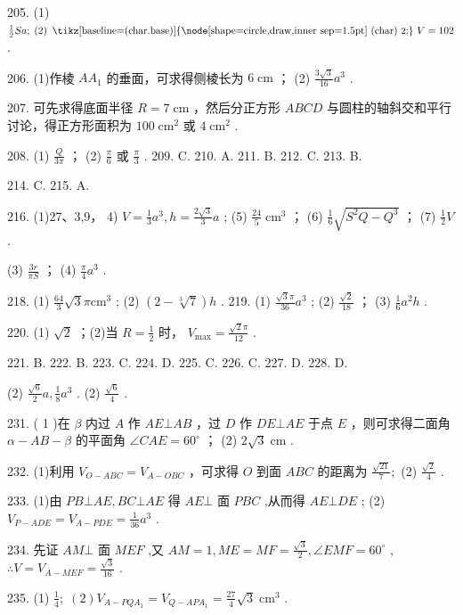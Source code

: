 \documentclass[10pt]{article}
\newcommand*\circled[1]{\tikz[baseline=(char.base)]{\node[shape=circle,draw,inner sep=1.5pt] (char) {\small #1};}}
\begin{document}
205. (1) \(\frac{1}{2}{Sa};\;\left( 2\right) \text{  \circled{2}  }V = {102}\) .

206. (1)作棱 \(A{A}_{1}\) 的垂面，可求得侧棱长为 \(6\mathrm{\;{cm}}\) ； (2) \(\frac{3\sqrt{3}}{16}{a}^{3}\) .

207. 可先求得底面半径 \(R = 7\mathrm{\;{cm}}\) ，然后分正方形 \({ABCD}\) 与圆柱的轴斜交和平行讨论，得正方形面积为 \({100}{\mathrm{\;{cm}}}^{2}\) 或 \(4{\mathrm{\;{cm}}}^{2}\) .

208. (1) \(\frac{Q}{3\pi }\) ； (2) \(\frac{\pi }{6}\) 或 \(\frac{\pi }{3}\) . 209. C. 210. A. 211. B. 212. C. 213. B.

214. C. 215. A.

216. (1)27、3,9， 4) \(V = \frac{1}{3}{a}^{3},h = \frac{2\sqrt{3}}{3}a\) ; (5) \(\frac{24}{5}{\mathrm{\;{cm}}}^{3}\) ； (6) \(\frac{1}{6}\sqrt{{S}^{2}Q - {Q}^{3}}\) ； (7) \(\frac{1}{2}V\) .

(3) \(\frac{3r}{\pi S}\) ； (4) \(\frac{\pi }{4}{a}^{3}\) .

218. (1) \(\frac{64}{3}\sqrt{3}\pi {\mathrm{{cm}}}^{3}\) ; (2) \(\left( {2 - \sqrt[3]{7}}\right) h\) . 219. (1) \(\frac{\sqrt{3}\pi }{36}{a}^{3}\) ; (2) \(\frac{\sqrt{2}}{18}\) ； (3) \(\frac{1}{6}{a}^{2}h\) .

220. (1) \(\sqrt{2}\) ；(2)当 \(R = \frac{1}{2}\) 时， \({V}_{\max } = \frac{\sqrt{2}\pi }{12}\) .

221. B. 222. B. 223. C. 224. D. 225. C. 226. C. 227. D. 228. D.

(2) \(\frac{\sqrt{6}}{2}a,\frac{1}{8}{a}^{3}\) . (2) \(\frac{\sqrt{6}}{4}\) .

231. ( 1 )在 \(\beta\) 内过 \(A\) 作 \({AE} \bot  {AB}\) ，过 \(D\) 作 \({DE} \bot  {AE}\) 于点 \(E\) ，则可求得二面角 \(\alpha  - {AB} - \beta\) 的平面角 \(\angle {CAE} = {60}^{ \circ  }\) ； (2) \(2\sqrt{3}\mathrm{\;{cm}}\) .

232. (1)利用 \({V}_{O - {ABC}} = {V}_{A - {OBC}}\) ，可求得 \(O\) 到面 \({ABC}\) 的距离为 \(\frac{\sqrt{21}}{7};\) (2) \(\frac{\sqrt{2}}{4}\) .

233. (1)由 \({PB} \bot  {AE},{BC} \bot  {AE}\) 得 \({AE} \bot\) 面 \({PBC}\) ,从而得 \({AE} \bot  {DE}\) ; (2) \({V}_{P - {ADE}} = {V}_{A - {PDE}} = \frac{1}{36}{a}^{3}\) .

234. 先证 \({AM} \bot\) 面 \({MEF}\) ,又 \({AM} = 1,{ME} = {MF} = \frac{\sqrt{3}}{2},\angle {EMF} = {60}^{ \circ  }\) , \(\therefore V = {V}_{A - {MEF}} = \frac{\sqrt{3}}{16}\) .

235. (1) \(\frac{1}{4};\;\left( 2\right) {V}_{A - {PQ}{A}_{1}} = {V}_{Q - {AP}{A}_{1}} = \frac{27}{4}\sqrt{3}{\mathrm{\;{cm}}}^{3}\) .
\end{document}
